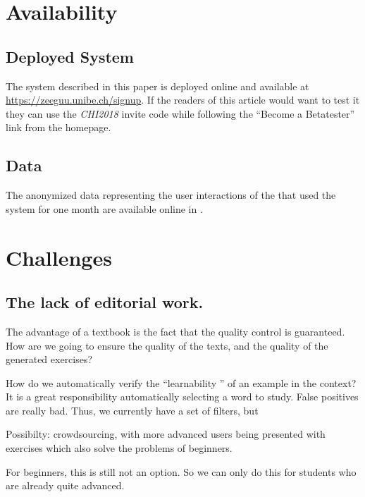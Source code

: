 


\section{Availability}

\subsection{Deployed System}
The system described in this paper is deployed online and available at \url{https://zeeguu.unibe.ch/signup}. If the readers of this article would want to test it they can use the {\em CHI2018} invite code while following the  ``Become a Betatester'' link from the homepage.



\subsection{Data}
The anonymized data representing the user interactions of the \students that used the system for one month are available online in . 




\newpage
\section{Challenges}

\subsection{The lack of editorial work.}
The advantage of a textbook is the fact that the quality control is guaranteed. How are we going to ensure the quality of the texts, and the quality of the generated exercises? 

How do we automatically verify the ``learnability '' of an example in the context? It is a great responsibility automatically selecting a word to study. False positives are really bad. Thus, we currently have a set of filters, but 

Possibilty: crowdsourcing, with more advanced users being presented with exercises which also solve the problems of beginners. 

For beginners, this is still not an option. So we can only do this for students who are already quite advanced. 





